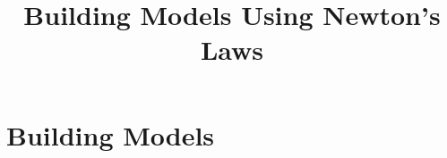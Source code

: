\documentclass[aspectratio=169,
hyperref={colorlinks,urlcolor=blue}
]{beamer}
\begin{document}

\section{Building Models}
\label{sec:buildingmodelsnl}
\title{Building Models Using Newton's Laws}
\author{\insertsubsection}


\begin{frame}
\titlepage
\thispagestyle{empty}
\end{frame}













\end{document}
